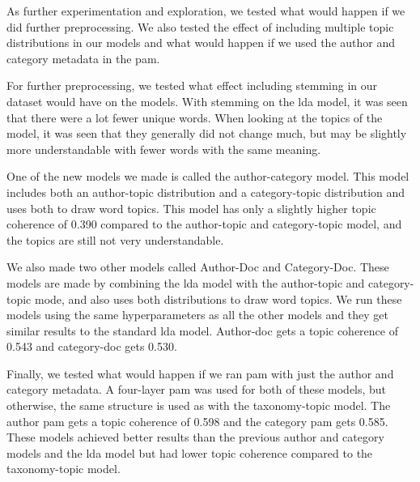 As further experimentation and exploration, we tested what would happen if we did further preprocessing.
We also tested the effect of including multiple topic distributions in our models and what would happen if we used the author and category metadata in the \gls{pam}.

For further preprocessing, we tested what effect including stemming in our dataset would have on the models.
With stemming on the \gls{lda} model, it was seen that there were a lot fewer unique words.
When looking at the topics of the model, it was seen that they generally did not change much, but may be slightly more understandable with fewer words with the same meaning.

One of the new models we made is called the author-category model.
This model includes both an author-topic distribution and a category-topic distribution and uses both to draw word topics.
This model has only a slightly higher topic coherence of 0.390 compared to the author-topic and category-topic model, and the topics are still not very understandable.

We also made two other models called Author-Doc and Category-Doc.
These models are made by combining the \gls{lda} model with the author-topic and category-topic mode, and also uses both distributions to draw word topics.
We run these models using the same hyperparameters as all the other models and they get similar results to the standard \gls{lda} model.
Author-doc gets a topic coherence of 0.543 and category-doc gets 0.530.

Finally, we tested what would happen if we ran \gls{pam} with just the author and category metadata.
A four-layer \gls{pam} was used for both of these models, but otherwise, the same structure is used as with the taxonomy-topic model.
The author \gls{pam} gets a topic coherence of 0.598 and the category \gls{pam} gets 0.585.
These models achieved better results than the previous author and category models and the \gls{lda} model but had lower topic coherence compared to the taxonomy-topic model.
